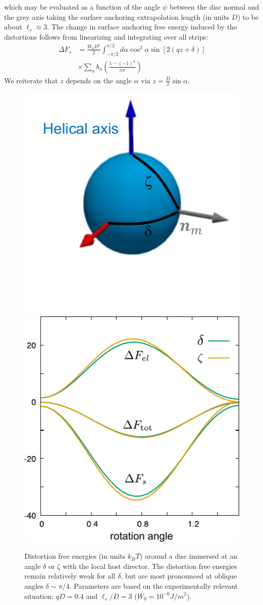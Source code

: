\eeq
which may be evaluated as a function of the angle $\psi$ between the disc normal and the grey axis taking the surface anchoring extrapolation length (in units $D$) to be about $\ell_{s} \approx 3$.
The change in surface anchoring free energy induced by the distortions follows from linearizing  and integrating over all strips:
\begin{align}
\Delta F_{s}  &= \frac{W_{0}D^{2}}{2} \int_{-\pi/2}^{\pi/2} d \alpha \cos^{2} \alpha \sin[2(qz + \delta)] \nonumber \\
&\times \sum_{n} b_{n}  \left ( \frac{1-(-1)^{n}}{n \pi}\right )
\label{sadiscseries}
\end{align}
We reiterate that $z$ depends on the angle $\alpha$ via $z = \tfrac{D}{2} \sin \alpha$.
\begin{figure}
\includegraphics[width = 0.4 \columnwidth]{figures/chapter-3/deldisc}
	\includegraphics[width = 0.5 \columnwidth]{figures/chapter-3/discelastic}
	\caption[ Distortion free energies (in units $k_{B}T$) around a disc immersed at an angle $\delta$ or $\zeta$ with the local host director]{ Distortion free energies (in units $k_{B}T$) around a disc immersed at an angle $\delta$ or $\zeta$ with the local host director. The distortion free energies remain relatively weak for all $\delta$, but are most pronounced at oblique angles $\delta \sim \pi/4$. Parameters are based on the experimentally relevant situation: $qD =0.4$ and $\ell_{s}/D = 3$ ($W_{0} = 10^{-6} J/m^{2}$). }
	\label{discel}
\end{figure}






